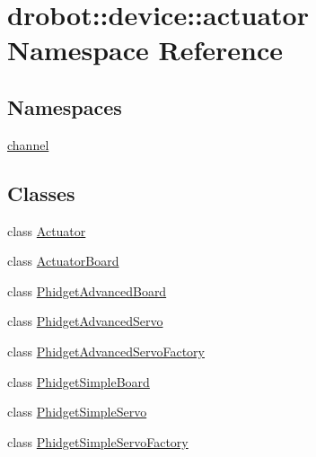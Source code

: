 \hypertarget{namespacedrobot_1_1device_1_1actuator}{\section{drobot\-:\-:device\-:\-:actuator Namespace Reference}
\label{namespacedrobot_1_1device_1_1actuator}
}
\subsection*{Namespaces}
\begin{DoxyCompactItemize}
\item 
\hyperlink{namespacedrobot_1_1device_1_1actuator_1_1channel}{channel}
\end{DoxyCompactItemize}
\subsection*{Classes}
\begin{DoxyCompactItemize}
\item 
class \hyperlink{classdrobot_1_1device_1_1actuator_1_1Actuator}{Actuator}
\item 
class \hyperlink{classdrobot_1_1device_1_1actuator_1_1ActuatorBoard}{Actuator\-Board}
\item 
class \hyperlink{classdrobot_1_1device_1_1actuator_1_1PhidgetAdvancedBoard}{Phidget\-Advanced\-Board}
\item 
class \hyperlink{classdrobot_1_1device_1_1actuator_1_1PhidgetAdvancedServo}{Phidget\-Advanced\-Servo}
\item 
class \hyperlink{classdrobot_1_1device_1_1actuator_1_1PhidgetAdvancedServoFactory}{Phidget\-Advanced\-Servo\-Factory}
\item 
class \hyperlink{classdrobot_1_1device_1_1actuator_1_1PhidgetSimpleBoard}{Phidget\-Simple\-Board}
\item 
class \hyperlink{classdrobot_1_1device_1_1actuator_1_1PhidgetSimpleServo}{Phidget\-Simple\-Servo}
\item 
class \hyperlink{classdrobot_1_1device_1_1actuator_1_1PhidgetSimpleServoFactory}{Phidget\-Simple\-Servo\-Factory}
\end{DoxyCompactItemize}
